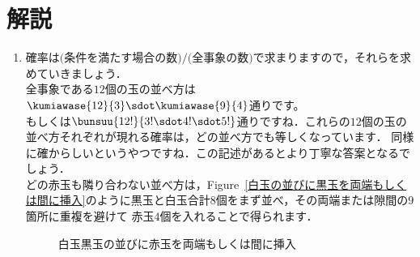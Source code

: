 \documentclass[../../../doc/main]{subfiles}
\begin{document}
    \setcounter{chapter}{2}
    \setcounter{section}{2}
    \section{解説}\label{解説2}
    \begin{enumerate}
        \item [\kakkoichi]
            \textcolor{myBlue2}{確率は$\text{(条件を満たす場合の数)}/\text{(全事象の数)}$で求まりますので，それらを求めていきましょう．} \\
            全事象である$12$個の玉の並べ方は$\kumiawase{12}{3}\sdot\kumiawase{9}{4}$通りです。 \\
            \textcolor{myBlue2}{もしくは$\bunsuu{12!}{3!\sdot4!\sdot5!}$通りですね．これらの$12$個の玉の並べ方それぞれが現れる確率は，どの並べ方でも等しくなっています．
            同様に確からしいというやつですね．この記述があるとより丁寧な答案となるでしょう．}\\
            どの赤玉も隣り合わない並べ方は，Figure~\ref{白玉の並びに黒玉を両端もしくは間に挿入}のように黒玉と白玉合計$8$個をまず並べ，その両端または隙間の$9$箇所に重複を避けて
            赤玉$4$個を入れることで得られます．
            \begin{figure}[htbp]
                \centering
                \caption{白玉黒玉の並びに赤玉を両端もしくは間に挿入}
                \label{白玉黒玉の並びに赤玉を両端もしくは間に挿入}
            \end{figure}\\

\end{enumerate}
\end{document}
